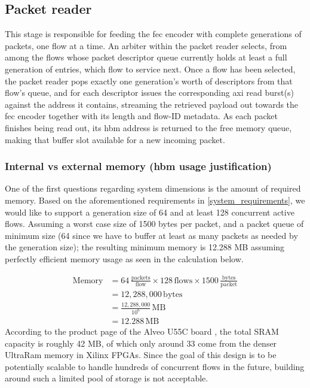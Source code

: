 \subsection{Packet reader}
This stage is responsible for feeding the \gls{fec} encoder with complete generations of
packets, one flow at a time. An arbiter within the packet reader selects, from among the
flows whose packet descriptor queue currently holds at least a full generation of entries,
which flow to service next. Once a flow has been selected, the packet reader pops exactly
one generation's worth of descriptors from that flow's queue, and for each descriptor issues
the corresponding \gls{axi} read burst(s) against the address it contains, streaming the
retrieved payload out towards the \gls{fec} encoder together with its length and flow-ID
metadata. As each packet finishes being read out, its \gls{hbm} address is returned to the
free memory queue, making that buffer slot available for a new incoming packet.

\subsubsection{Internal vs external memory (\gls{hbm} usage justification)}
One of the first questions regarding system dimensions is the amount of required memory. Based on the aforementioned 
requirements in \ref{system_requirements}, we would like to support a generation size of 64
and at least 128 concurrent active flows. Assuming a worst case size of 1500 bytes per packet, and a packet queue of minimum size
(64 since we have to buffer at least as many packets as needed by the generation size); the resulting minimum memory is 12.288 MB
assuming perfectly efficient memory usage as seen in the calculation below.

\[
\begin{aligned}
\text{Memory}
&= 64\,\frac{\text{packets}}{\text{flow}}
\times 128\,\text{flows}
\times 1500\,\frac{\text{bytes}}{\text{packet}} \\[4pt]
&= 12{,}288{,}000\,\text{bytes} \\[4pt]
&= \frac{12{,}288{,}000}{10^6}\,\text{MB} \\[4pt]
&= \boxed{12.288\,\text{MB}}
\end{aligned}
\]
According to the product page of the Alveo U55C board \cite{amd_alveo_u55c}, the total SRAM capacity is roughly 42 MB, of which only
around 33 come from the denser UltraRam memory in Xilinx FPGAs. Since the goal of this design is to be potentially scalable to handle
hundreds of concurrent flows in the future, building around such a limited pool of storage is not acceptable. \\

